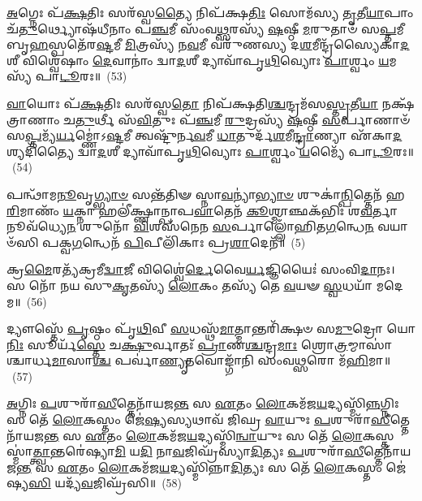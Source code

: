 \-\ul{𑌅}\-𑌗𑍍𑌨𑍇𑌃 𑌪᳴\-\ul{𑌕𑍍𑌷}\-𑌤𑌿𑌃 𑌸𑌰᳴𑌸𑍍𑌵\-\ul{𑌤𑍍𑌯𑍈} 𑌨𑌿𑌪᳴𑌕𑍍𑌷\-\ul{𑌤𑌿𑌃} 𑌸𑍋𑌮᳴𑌸𑍍𑌯 \ul{𑌤𑍃}\-𑌤𑍀\-\ul{𑌯𑌾}\-𑌪𑌾𑌂 𑌚᳴\-\ul{𑌤𑍁}\-𑌰𑍍𑌥𑍍𑌯𑍋𑌷᳴𑌧𑍀𑌨𑌾𑌂 𑌪\-\ul{𑌞𑍍𑌚}\-𑌮𑍀 𑌸𑌂᳴𑌵\-\ul{𑌥𑍍𑌸}\-𑌰𑌸𑍍𑌯᳴ \ul{𑌷}\-𑌷𑍍𑌠𑍀 \ul{𑌮}\-𑌰𑍁𑌤𑌾𑍞᳴ 𑌸\-\ul{𑌪𑍍𑌤}\-𑌮𑍀 𑌬𑍃\-\ul{𑌹}\-𑌸𑍍𑌪𑌤𑍇᳴𑌰\-\ul{𑌷𑍍𑌟}\-𑌮𑍀 \ul{𑌮𑌿}\-𑌤𑍍𑌰𑌸𑍍𑌯᳴ 𑌨\-\ul{𑌵}\-𑌮𑍀 𑌵𑌰𑍁᳴𑌣𑌸𑍍𑌯 𑌦\-\ul{𑌶}\-𑌮𑍀𑌨𑍍𑌦𑍍𑌰᳴𑌸𑍍𑌯𑍈𑌕𑌾\-\ul{𑌦}\-𑌶𑍀 𑌵𑌿𑌶𑍍𑌵𑍇᳴𑌷𑌾𑌂 \ul{𑌦𑍇}\-𑌵𑌾𑌨𑌾𑌂॑ 𑌦𑍍𑌵𑌾\-\ul{𑌦}\-𑌶𑍀 𑌦𑍍𑌯𑌾𑌵𑌾᳴𑌪𑍃\-\ul{𑌥𑌿}\-𑌵𑍍𑌯𑍋𑌃 \ul{𑌪𑌾}\-𑌰𑍍𑌶𑍍𑌵𑌂 \ul{𑌯}\-𑌮𑌸𑍍𑌯᳴ 𑌪𑌾\-\ul{𑌟𑍂}\-𑌰𑌃॥~(53)

{\anuvakamend[{\-\ul{𑌅}\-𑌗𑍍𑌨𑍇𑌰𑍇\-\ul{𑌕𑌾}\-𑌨𑍍𑌨\-\ul{𑌤𑍍𑌰𑌿}\-\-\ul{𑍞}\-𑌶𑌤𑍍}]}%

\-\ul{𑌵𑌾}\-𑌯𑍋𑌃 𑌪᳴\-\ul{𑌕𑍍𑌷}\-𑌤𑌿𑌃 𑌸𑌰᳴𑌸𑍍𑌵\-\ul{𑌤𑍋} 𑌨𑌿𑌪᳴𑌕𑍍𑌷𑌤𑌿\-\ul{𑌶𑍍𑌚}\-𑌨𑍍𑌦𑍍𑌰𑌮᳴𑌸\-\ul{𑌸𑍍𑌤𑍃}\-𑌤𑍀\-\ul{𑌯𑌾} 𑌨𑌕𑍍𑌷᳴𑌤𑍍𑌰𑌾𑌣𑌾𑌂 𑌚\-\ul{𑌤𑍁}\-𑌰𑍍𑌥𑍀 𑌸᳴\-\ul{𑌵𑌿}\-𑌤𑍁𑌃 𑌪᳴\-\ul{𑌞𑍍𑌚}\-𑌮𑍀 \ul{𑌰𑍁}\-𑌦𑍍𑌰𑌸𑍍𑌯᳴ \ul{𑌷}\-𑌷𑍍𑌠𑍀 \ul{𑌸}\-𑌰𑍍𑌪𑌾𑌣𑌾𑍞᳴ 𑌸\-\ul{𑌪𑍍𑌤}\-𑌮𑍍𑌯᳴\-\ul{𑌰𑍍𑌯}\-𑌮𑍍𑌣𑍋॑\-𑌽\-\ul{𑌷𑍍𑌟}\-𑌮𑍀 𑌤𑍍𑌵𑌷𑍍𑌟𑍁᳴𑌰𑍍𑌨\-\ul{𑌵}\-𑌮𑍀 \ul{𑌧𑌾}\-𑌤𑍁𑌰𑍍𑌦᳴\-\ul{𑌶}\-𑌮𑍀\-\ul{𑌨𑍍𑌦𑍍𑌰𑌾}\-𑌣𑍍𑌯𑌾 𑌏᳴𑌕𑌾\-\ul{𑌦}\-𑌶𑍍𑌯𑌦𑌿᳴𑌤𑍍𑌯𑍈 𑌦𑍍𑌵𑌾\-\ul{𑌦}\-𑌶𑍀 𑌦𑍍𑌯𑌾𑌵𑌾᳴𑌪𑍃\-\ul{𑌥𑌿}\-𑌵𑍍𑌯𑍋𑌃 \ul{𑌪𑌾}\-𑌰𑍍𑌶𑍍𑌵𑌂 \ul{𑌯}\-𑌮𑍍𑌯𑍈᳴ 𑌪𑌾\-\ul{𑌟𑍂}\-𑌰𑌃॥~(54)

{\anuvakamend[{\-\ul{𑌵𑌾}\-𑌯𑍋\-\ul{𑌰}\-𑌷𑍍𑌟𑌾𑌵𑌿𑍞᳴𑌶𑌤𑌿𑌃}]}%

𑌪𑌨𑍍𑌥𑌾᳴𑌮\-\ul{𑌨𑍂}\-𑌵𑍃\-\ul{𑌗𑍍𑌭𑍍𑌯𑌾}\-\-\ul{𑍞} 𑌸𑌨𑍍𑌤᳴𑌤𑌿𑍟 𑌸𑍍𑌨𑌾\-\ul{𑌵}\-𑌨𑍍𑌯𑌾॑\-\ul{𑌭𑍍𑌯𑌾}\-\-\ul{𑍞} 𑌶𑍁𑌕𑌾॑\-\ul{𑌨𑍍𑌪𑌿}\-𑌤𑍍𑌤𑍇𑌨᳴ 𑌹\-\ul{𑌰𑌿}\-𑌮𑌾𑌣𑌂᳴ \ul{𑌯}\-𑌕𑍍𑌨𑌾 𑌹𑌲𑍀॑𑌕𑍍𑌷𑍍𑌣𑌾𑌨𑍍𑌪𑌾𑌪\-\ul{𑌵𑌾}\-𑌤𑍇𑌨᳴ \ul{𑌕𑍂}\-𑌶𑍍𑌮𑌾𑌞𑍍𑌛𑌕᳴𑌭𑌿𑌃 𑌶\-\ul{𑌵}\-𑌰𑍍𑌤𑌾𑌨𑍂𑌵᳴𑌧𑍍𑌯𑍇\-\ul{𑌨} 𑌶𑍁𑌨𑍋᳴ \ul{𑌵𑌿}\-𑌶𑌸᳴𑌨𑍇𑌨 \ul{𑌸}\-𑌰𑍍𑌪𑌾𑌲𑍍𑌲𑍋𑌁᳴𑌹𑌿𑌤\-\ul{𑌗}\-𑌨𑍍𑌧𑍇\-\ul{𑌨} 𑌵𑌯𑌾𑍞᳴𑌸𑌿 𑌪𑌕𑍍𑌵\-\ul{𑌗}\-𑌨𑍍𑌧𑍇𑌨᳴ \ul{𑌪𑌿}\-𑌪𑍀𑌲𑌿᳴𑌕𑌾𑌃 𑌪𑍍𑌰\-\ul{𑌶𑌾}\-𑌦𑍇𑌨᳴॥~(5)

{\anuvakamend[{𑌪\-\ul{𑌨𑍍𑌥𑌾}\-𑌨𑍍𑌦𑍍𑌵𑌾𑌵𑌿𑍞᳴𑌶𑌤𑌿𑌃}]}%

𑌕𑍍𑌰\-\ul{𑌮𑍈}\-𑌰𑌤𑍍𑌯᳴𑌕𑍍𑌰𑌮𑍀\-\ul{𑌦𑍍𑌵𑌾}\-𑌜𑍀 𑌵𑌿𑌶𑍍𑌵𑍈॑\-\ul{𑌰𑍍𑌦𑍇}\-𑌵𑍈\-\ul{𑌰𑍍𑌯}\-𑌜𑍍𑌞𑌿𑌯𑍈𑌃॑ 𑌸𑌂𑌵𑌿\-\ul{𑌦𑌾}\-𑌨𑌃। 𑌸 𑌨𑍋᳴ 𑌨𑌯 𑌸𑍁\-\ul{𑌕𑍃}\-𑌤𑌸𑍍𑌯᳴ \ul{𑌲𑍋}\-𑌕𑌂 𑌤𑌸𑍍𑌯᳴ 𑌤𑍇 \ul{𑌵}\-𑌯𑍟 \ul{𑌸𑍍𑌵}\-𑌧𑌯𑌾᳴ 𑌮𑌦𑍇𑌮॥~(56)

{\anuvakamend[{𑌕𑍍𑌰𑌮𑍈᳴\-\ul{𑌰}\-𑌷𑍍𑌟𑌾𑌦᳴𑌶}]}%

𑌦𑍍𑌯𑍗𑌸𑍍𑌤𑍇᳴ \ul{𑌪𑍃}\-𑌷𑍍𑌠𑌂 𑌪𑍃᳴\-\ul{𑌥𑌿}\-𑌵𑍀 \ul{𑌸}\-𑌧𑌸𑍍𑌥᳴\-\ul{𑌮𑌾}\-𑌤𑍍𑌮𑌾𑌨𑍍𑌤𑌰𑌿᳴𑌕𑍍𑌷𑍞 𑌸\-\ul{𑌮𑍁}\-𑌦𑍍𑌰𑍋 𑌯𑍋\-\ul{𑌨𑌿𑌃} 𑌸𑍂𑌰𑍍𑌯᳴\-\ul{𑌸𑍍𑌤𑍇} 𑌚\-\ul{𑌕𑍍𑌷𑍁}\-𑌰𑍍𑌵𑌾𑌤𑌃᳴ \ul{𑌪𑍍𑌰𑌾}\-𑌣\-\ul{𑌶𑍍𑌚}\-𑌨𑍍𑌦𑍍𑌰\-\ul{𑌮𑌾𑌃} 𑌶𑍍𑌰𑍋\-\ul{𑌤𑍍𑌰}\-𑌮𑍍𑌮𑌾𑌸𑌾॑𑌶𑍍𑌚𑌾𑌰𑍍𑌧\-\ul{𑌮𑌾}\-𑌸𑌾\-\ul{𑌶𑍍𑌚} 𑌪𑌰𑍍𑌵𑌾॑\-\ul{𑌣𑍍𑌯𑍃}\-𑌤𑌵𑍋𑌙𑍍𑌗𑌾᳴𑌨𑌿 𑌸𑌂𑌵\-\ul{𑌥𑍍𑌸}\-𑌰𑍋 𑌮᳴\-\ul{𑌹𑌿}\-𑌮𑌾॥~(57)

{\anuvakamend[{𑌦𑍍𑌯𑍗𑌃 𑌪𑌞𑍍𑌚᳴𑌵𑌿𑍞𑌶𑌤𑌿𑌃}]}%

\-\ul{𑌅}\-𑌗𑍍𑌨𑌿𑌃 \ul{𑌪}\-𑌶𑍁𑌰𑌾᳴\-\ul{𑌸𑍀}\-𑌤𑍍𑌤𑍇𑌨𑌾᳴𑌯𑌜\-\ul{𑌨𑍍𑌤} 𑌸 \ul{𑌏}\-𑌤𑌂 \ul{𑌲𑍋}\-𑌕𑌮᳴𑌜\-\ul{𑌯}\-𑌦𑍍𑌯𑌸𑍍𑌮𑌿᳴\-\ul{𑌨𑍍𑌨}\-𑌗𑍍𑌨𑌿𑌃 𑌸 𑌤𑍇᳴ \ul{𑌲𑍋}\-𑌕𑌸𑍍𑌤𑌂 𑌜𑍇॑\-\ul{𑌷𑍍𑌯}\-𑌸𑍍𑌯𑌥𑌾𑌵᳴ 𑌜𑌿𑌘𑍍𑌰 \ul{𑌵𑌾}\-𑌯𑍁𑌃 \ul{𑌪}\-𑌶𑍁𑌰𑌾᳴\-\ul{𑌸𑍀}\-𑌤𑍍𑌤𑍇𑌨𑌾᳴𑌯𑌜\-\ul{𑌨𑍍𑌤} 𑌸 \ul{𑌏}\-𑌤𑌂 \ul{𑌲𑍋}\-𑌕𑌮᳴𑌜\-\ul{𑌯}\-𑌦𑍍𑌯𑌸𑍍𑌮𑌿᳴\-\ul{𑌨𑍍𑌵𑌾}\-𑌯𑍁𑌃 𑌸 𑌤𑍇᳴ \ul{𑌲𑍋}\-𑌕𑌸𑍍𑌤𑌸𑍍𑌮𑌾॑\-\ul{𑌤𑍍𑌤𑍍𑌵𑌾}\-𑌨𑍍𑌤𑌰𑍇॑𑌷𑍍𑌯𑌾\-\ul{𑌮𑌿} 𑌯\-\ul{𑌦𑌿} 𑌨𑌾\-\ul{𑌵}\-𑌜𑌿𑌘𑍍𑌰᳴𑌸𑍍𑌯𑌾\-\ul{𑌦𑌿}\-𑌤𑍍𑌯𑌃 \ul{𑌪}\-𑌶𑍁𑌰𑌾᳴\-\ul{𑌸𑍀}\-𑌤𑍍𑌤𑍇𑌨𑌾᳴𑌯𑌜\-\ul{𑌨𑍍𑌤} 𑌸 \ul{𑌏}\-𑌤𑌂 \ul{𑌲𑍋}\-𑌕𑌮᳴𑌜\-\ul{𑌯}\-𑌦𑍍𑌯𑌸𑍍𑌮𑌿᳴𑌨𑍍𑌨𑌾\-\ul{𑌦𑌿}\-𑌤𑍍𑌯𑌃 𑌸 𑌤𑍇᳴ \ul{𑌲𑍋}\-𑌕𑌸𑍍𑌤𑌂 𑌜𑍇॑𑌷𑍍𑌯\-\ul{𑌸𑌿} 𑌯𑌦𑍍𑌯᳴\-\ul{𑌵}\-𑌜𑌿𑌘𑍍𑌰᳴𑌸𑌿॥~(58)

